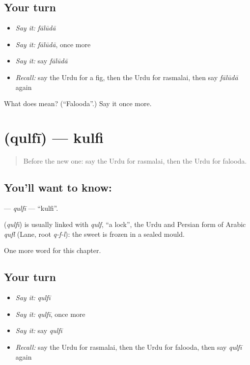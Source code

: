 \subsection*{Your turn}
\begin{itemize}
\raggedright
  \item \emph{Say it:} \emph{fālūdā}
  \item \emph{Say it:} \emph{fālūdā}, once more
  \item \emph{Say it:} say \emph{fālūdā}
  \item \emph{Recall:} say the Urdu for a fig, then the Urdu for rasmalai, then say \emph{fālūdā} again
\end{itemize}

\begin{tcolorbox}[breakable,colback=teal!4,colframe=teal!35!black,title={Before you move on}]
What does  mean? (\textquotedblleft{}Falooda\textquotedblright{}.) Say it once more.
\end{tcolorbox}
\section[\texorpdfstring{\ur{قلفی} (qulfī)}{قلفی (qulfī)}]{ (qulfī) — kulfi}

\label{lesson:UR-C175-qulfi}



\begin{quote}
Before the new one: say the Urdu for rasmalai, then the Urdu for falooda.
\end{quote}

\subsection*{You'll want to know: }
\textbf{} — \emph{qulfī} — \textquotedblleft{}kulfi\textquotedblright{}.

\begin{cousinweb}
\textbf{} (\emph{qulfī}) is usually linked with \emph{qulf}, \textquotedblleft{}a lock\textquotedblright{}, the Urdu and Persian form of Arabic \emph{qufl} (Lane, root \emph{q-f-l}): the sweet is frozen in a sealed mould.
\end{cousinweb}

\begin{grammarlens}[title={What you've built}]
One more word for this chapter.
\end{grammarlens}

\subsection*{Your turn}
\begin{itemize}
\raggedright
  \item \emph{Say it:} \emph{qulfī}
  \item \emph{Say it:} \emph{qulfī}, once more
  \item \emph{Say it:} say \emph{qulfī}
  \item \emph{Recall:} say the Urdu for rasmalai, then the Urdu for falooda, then say \emph{qulfī} again
\end{itemize}

